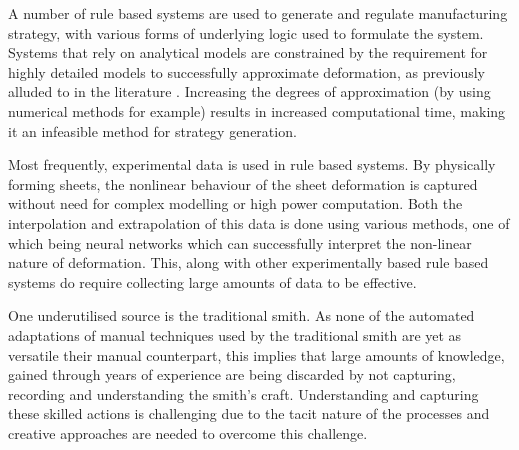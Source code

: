 A number of rule based systems are used to generate and regulate manufacturing strategy, with various forms of underlying logic used to formulate the system. Systems that rely on analytical models are constrained by the requirement for highly detailed models to successfully approximate deformation, as previously alluded to in the literature \citep{Allwood2016Closed-loopForming}. Increasing the degrees of approximation (by using numerical methods for example) results in increased computational time, making it an infeasible method for strategy generation.

Most frequently, experimental data is used in rule based systems. By physically forming sheets, the nonlinear behaviour of the sheet deformation is captured without need for complex modelling or high power computation. Both the interpolation and extrapolation of this data is done using various methods, one of which being neural networks which can successfully interpret the non-linear nature of deformation. This, along with other experimentally based rule based systems do require collecting large amounts of data to be effective.

One underutilised source is the traditional smith. As none of the automated adaptations of manual techniques used by the traditional smith are yet as versatile their manual counterpart, this implies that large amounts of knowledge, gained through years of experience are being discarded by not capturing, recording and understanding the smith’s craft. Understanding and capturing these skilled actions is challenging due to the tacit nature of the processes and creative approaches are needed to overcome this challenge.











